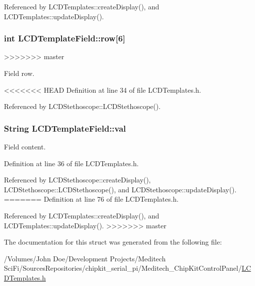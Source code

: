 Referenced by L\-C\-D\-Templates\-::create\-Display(), and L\-C\-D\-Templates\-::update\-Display().

\hypertarget{struct_l_c_d_template_field_a8c1f20c4249d9b0e338609e89499216e}{
\subsubsection[{row}]{\setlength{\rightskip}{0pt plus 5cm}int L\-C\-D\-Template\-Field\-::row\mbox{[}6\mbox{]}}}\label{struct_l_c_d_template_field_a8c1f20c4249d9b0e338609e89499216e}
>>>>>>> master


Field row. 



<<<<<<< HEAD
Definition at line 34 of file L\-C\-D\-Templates.\-h.



Referenced by L\-C\-D\-Stethoscope\-::\-L\-C\-D\-Stethoscope().

\hypertarget{struct_l_c_d_template_field_a6eb7ce0547fc28ac3a2538f0fac3f117}{
\subsubsection[{val}]{\setlength{\rightskip}{0pt plus 5cm}String L\-C\-D\-Template\-Field\-::val}}\label{struct_l_c_d_template_field_a6eb7ce0547fc28ac3a2538f0fac3f117}


Field content. 



Definition at line 36 of file L\-C\-D\-Templates.\-h.



Referenced by L\-C\-D\-Stethoscope\-::create\-Display(), L\-C\-D\-Stethoscope\-::\-L\-C\-D\-Stethoscope(), and L\-C\-D\-Stethoscope\-::update\-Display().
=======
Definition at line 76 of file L\-C\-D\-Templates.\-h.



Referenced by L\-C\-D\-Templates\-::create\-Display(), and L\-C\-D\-Templates\-::update\-Display().
>>>>>>> master



The documentation for this struct was generated from the following file\-:\begin{DoxyCompactItemize}
\item 
/\-Volumes/\-John Doe/\-Development Projects/\-Meditech Sci\-Fi/\-Sources\-Repositories/chipkit\-\_\-serial\-\_\-pi/\-Meditech\-\_\-\-Chip\-Kit\-Control\-Panel/\hyperlink{_l_c_d_templates_8h}{L\-C\-D\-Templates.\-h}\end{DoxyCompactItemize}
